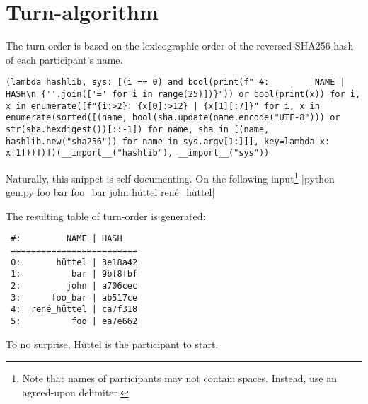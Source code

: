 \documentclass[12pt, a4paper]{article}
\begin{document}
\section{Turn-algorithm}\label{turn_alg}
The turn-order is based on the lexicographic order of the reversed SHA256-hash of each participant's name.
\begin{code}
\begin{verbatim}
(lambda hashlib, sys: [(i == 0) and bool(print(f" #:         NAME | HASH\n {''.join(['=' for i in range(25)])}")) or bool(print(x)) for i, x in enumerate([f"{i:>2}: {x[0]:>12} | {x[1][:7]}" for i, x in enumerate(sorted([(name, bool(sha.update(name.encode("UTF-8"))) or str(sha.hexdigest())[::-1]) for name, sha in [(name, hashlib.new("sha256")) for name in sys.argv[1:]]], key=lambda x: x[1]))])])(__import__("hashlib"), __import__("sys"))
\end{verbatim}
\end{code}

Naturally, this snippet is self-documenting. On the following input\footnote{Note that names of participants may not contain spaces. Instead, use an agreed-upon delimiter.} |python gen.py foo bar foo_bar john hüttel rené_hüttel|

The resulting table of turn-order is generated:

\begin{code}
\begin{verbatim}
 #:         NAME | HASH
 =========================
 0:       hüttel | 3e18a42
 1:          bar | 9bf8fbf
 2:         john | a706cec
 3:      foo_bar | ab517ce
 4:  rené_hüttel | ca7f318
 5:          foo | ea7e662
\end{verbatim}
\end{code}

To no surprise, Hüttel is the participant to start. 
\end{document}
